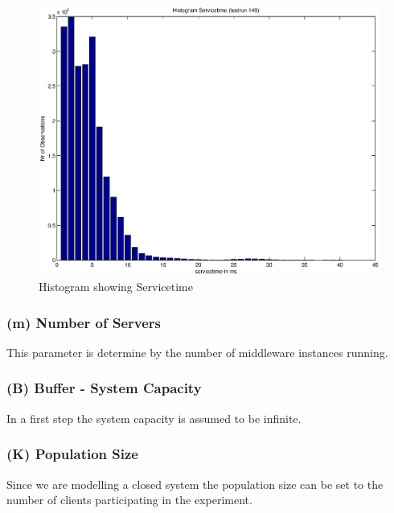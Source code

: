 \documentclass[a4paper]{article}
\begin{document}

\begin{figure}[H]
	\begin{center}
    \includegraphics[scale=0.6]{../plots-ms2-mg/servicetime.eps}
  \end{center}
  \caption{Histogram showing Servicetime}
  \label{fig:servicetime}
\end{figure}



\subsubsection{(m) Number of Servers}

This parameter is determine by the number of middleware instances running.

\subsubsection{(B) Buffer - System Capacity }
In a first step the system capacity is assumed to be infinite.

\subsubsection{(K) Population Size}

Since we are modelling a closed system the population size can be set to the number of clients participating in the experiment.
\end{document}
